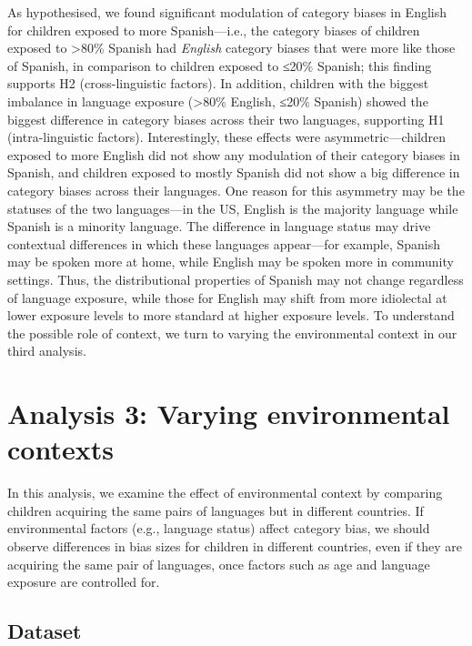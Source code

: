 \documentclass[10pt, letterpaper]{article}
\begin{document}
As hypothesised, we found significant modulation of category biases in
English for children exposed to more Spanish---i.e., the category biases
of children exposed to \textgreater80\% Spanish had \emph{English}
category biases that were more like those of Spanish, in comparison to
children exposed to ≤20\% Spanish; this finding supports H2
(cross-linguistic factors). In addition, children with the biggest
imbalance in language exposure (\textgreater80\% English, ≤20\% Spanish)
showed the biggest difference in category biases across their two
languages, supporting H1 (intra-linguistic factors). Interestingly,
these effects were asymmetric---children exposed to more English did not
show any modulation of their category biases in Spanish, and children
exposed to mostly Spanish did not show a big difference in category
biases across their languages. One reason for this asymmetry may be the
statuses of the two languages---in the US, English is the majority
language while Spanish is a minority language. The difference in
language status may drive contextual differences in which these
languages appear---for example, Spanish may be spoken more at home,
while English may be spoken more in community settings. Thus, the
distributional properties of Spanish may not change regardless of
language exposure, while those for English may shift from more
idiolectal at lower exposure levels to more standard at higher exposure
levels. To understand the possible role of context, we turn to varying
the environmental context in our third analysis.

\section{Analysis 3: Varying environmental
contexts}\label{analysis-3-varying-environmental-contexts}

In this analysis, we examine the effect of environmental context by
comparing children acquiring the same pairs of languages but in
different countries. If environmental factors (e.g., language status)
affect category bias, we should observe differences in bias sizes for
children in different countries, even if they are acquiring the same
pair of languages, once factors such as age and language exposure are
controlled for.

\subsection{Dataset}\label{dataset-2}
\end{document}
